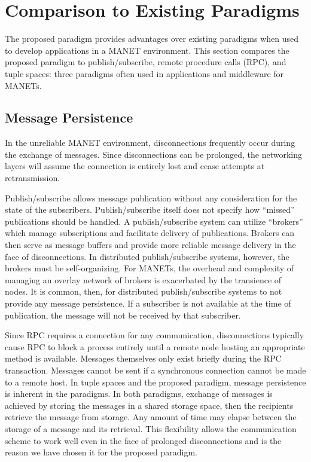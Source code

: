 \documentclass[lnicst]{svmultln}
\begin{document}
\section{Comparison to Existing Paradigms}

The proposed paradigm provides advantages over existing paradigms when used to develop applications in a MANET environment. This section compares the proposed paradigm to publish/subscribe, remote procedure calls (RPC), and tuple spaces: three paradigms often used in applications and middleware for MANETs.

\subsection{Message Persistence}

In the unreliable MANET environment, disconnections frequently occur during the exchange of messages. Since disconnections can be prolonged, the networking layers will assume the connection is entirely lost and cease attempts at retransmission.

    Publish/subscribe allows message publication without any consideration for the state of the subscribers. Publish/subscribe itself does not specify how “missed” publications should be handled. A publish/subscribe system can utilize “brokers” which manage subscriptions and facilitate delivery of publications. Brokers can then serve as message buffers and provide more reliable message delivery in the face of disconnections. In distributed publish/subscribe systems, however, the brokers must be self-organizing. For MANETs, the overhead and complexity of managing an overlay network of brokers is exacerbated by the transience of nodes. It is common, then, for distributed publish/subscribe systems to not provide any message persistence. If a subscriber is not available at the time of publication, the message will not be received by that subscriber.

    Since RPC requires a connection for any communication, disconnections typically cause RPC to block a process entirely until a remote node hosting an appropriate method is available. Messages themselves only exist briefly during the RPC transaction. Messages cannot be sent if a synchronous connection cannot be made to a remote host.
    In tuple spaces and the proposed paradigm, message persistence is inherent in the paradigms. In both paradigms, exchange of messages is achieved by storing the messages in a shared storage space, then the recipients retrieve the message from storage. Any amount of time may elapse between the storage of a message and its retrieval. This flexibility allows the communication scheme to work well even in the face of prolonged disconnections and is the reason we have chosen it for the proposed paradigm.
    
\end{document}

